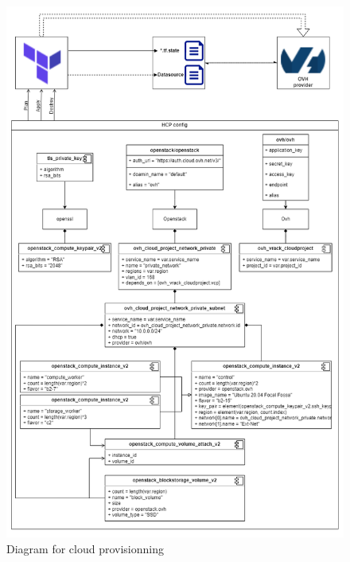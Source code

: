 \begin{figure}[H]\centering
\includegraphics[width=1.0\textwidth]{assets/f14.png}
\caption{Diagram for cloud provisionning}
\label{fig:fig14}
\end{figure}


